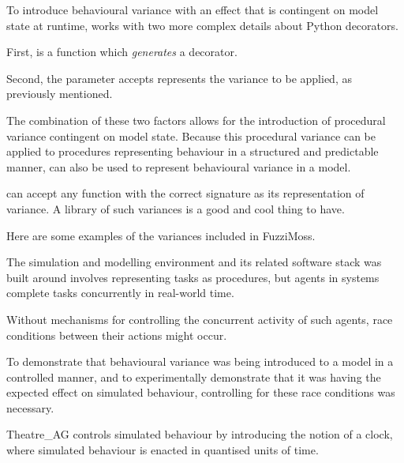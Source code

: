 
To introduce behavioural variance with an effect that is contingent on model
state at runtime, \atfuzz works with two more complex details about Python
decorators.

First, \atfuzz is a function which \emph{generates} a decorator.

Second, the parameter \atfuzz accepts represents the variance to be applied, as
previously mentioned.

The combination of these two factors allows for the introduction of procedural
variance contingent on model state. Because this procedural variance can be
applied to procedures representing behaviour in a structured and predictable
manner, \atfuzz can also be used to represent behavioural variance in a model.



\atfuzz can accept any function with the correct signature as its representation
of variance. A library of such variances is a good and cool thing to have.

Here are some examples of the variances included in FuzziMoss.


\expand
The simulation and modelling environment \pdsf and its related software stack
was built around involves representing tasks as procedures, but agents in
\sociotechnical systems complete tasks concurrently in real-world time.

\expand
Without mechanisms for controlling the concurrent activity of such agents, race
conditions between their actions might occur.

\expand
To demonstrate that behavioural variance was being introduced to a model in a
controlled manner, and to experimentally demonstrate that it was having the
expected effect on simulated behaviour, controlling for these race conditions
was necessary.

\expand
Theatre_AG controls simulated behaviour by introducing the notion of a clock,
where simulated behaviour is enacted in quantised units of time.



